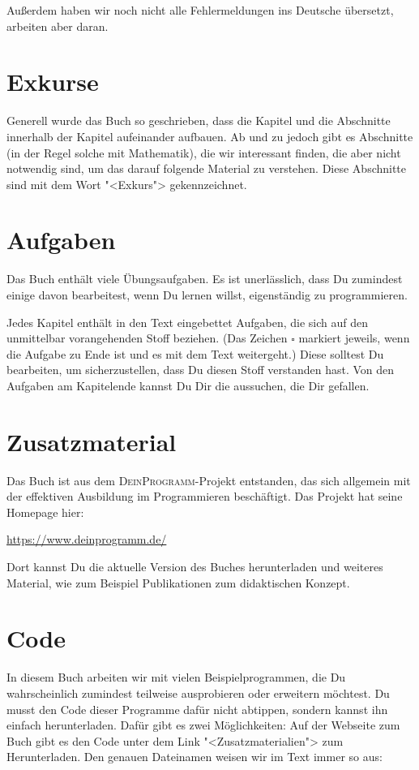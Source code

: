Außerdem haben wir noch nicht alle Fehlermeldungen ins Deutsche
übersetzt, arbeiten aber daran.

\section{Exkurse}

Generell wurde das Buch so geschrieben, dass die Kapitel und die
Abschnitte innerhalb der Kapitel aufeinander aufbauen.  Ab und zu
jedoch gibt es Abschnitte (in der Regel solche mit Mathematik), die
wir interessant finden, die aber nicht notwendig sind, um das darauf
folgende Material zu verstehen.  Diese Abschnitte sind mit dem Wort
"<Exkurs"> gekennzeichnet.

\section{Aufgaben}

Das Buch enthält viele Übungsaufgaben.  Es ist unerlässlich, dass Du
zumindest einige davon bearbeitest, wenn Du lernen willst,
eigenständig zu programmieren.

Jedes Kapitel enthält in den Text eingebettet Aufgaben, die sich auf
den unmittelbar vorangehenden Stoff beziehen.  (Das Zeichen
\(\square\) markiert jeweils, wenn die Aufgabe zu Ende ist und es mit
dem Text weitergeht.)  Diese solltest Du bearbeiten, um
sicherzustellen, dass Du diesen Stoff verstanden hast.  Von den
Aufgaben am Kapitelende kannst Du Dir die aussuchen, die Dir gefallen.

\section{Zusatzmaterial}

Das Buch ist aus dem \textsc{DeinProgramm}-Projekt entstanden, das
sich allgemein mit der effektiven Ausbildung im Programmieren
beschäftigt.  Das Projekt hat seine Homepage hier:
%
\begin{center}
  \url{https://www.deinprogramm.de/}
\end{center}
%
Dort kannst Du die aktuelle Version des Buches herunterladen und
weiteres Material, wie zum Beispiel Publikationen zum didaktischen
Konzept.

\section{Code}

In diesem Buch arbeiten wir mit vielen Beispielprogrammen, die Du
wahrscheinlich zumindest teilweise ausprobieren oder erweitern
möchtest.  Du musst den Code dieser Programme dafür nicht abtippen,
sondern kannst ihn einfach herunterladen.  Dafür gibt es zwei
Möglichkeiten: Auf der Webseite zum Buch gibt es den Code unter dem
Link "<Zusatzmaterialien"> zum Herunterladen.  Den genauen Dateinamen
weisen wir im Text immer so aus:


